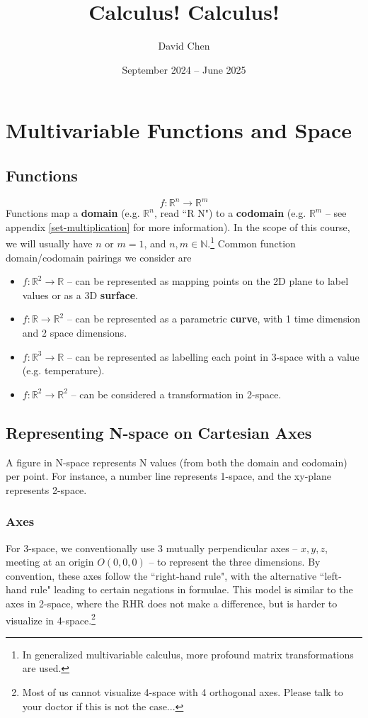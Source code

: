\documentclass{article}
\title{Calculus! Calculus!}
\author{David Chen}
\date{September 2024 -- June 2025}
\begin{document}
\maketitle

\section{Multivariable Functions and Space}

\subsection{Functions}
$$f: \mathbb{R}^n \to \mathbb{R}^m$$
Functions map a \textbf{domain} (e.g. $\mathbb{R}^n$, read ``R N") to a \textbf{codomain} (e.g. $\mathbb{R}^m$ -- see appendix \ref{set-multiplication} for more information). In the scope of this course, we will usually have $n$ or $m = 1$, and $n,m \in \mathbb{N}$.\footnote{In generalized multivariable calculus, more profound matrix transformations are used.}
Common function domain/codomain pairings we consider are
\begin{itemize}
    \item $f: \mathbb{R}^2 \to \mathbb{R}$ -- can be represented as mapping points on the 2D plane to label values or as a 3D \textbf{surface}.
    \item $f: \mathbb{R} \to \mathbb{R}^2$ -- can be represented as a parametric \textbf{curve}, with 1 time dimension and 2 space dimensions.
    \item $f: \mathbb{R}^3 \to \mathbb{R}$ -- can be represented as labelling each point in 3-space with a value (e.g. temperature).
    \item $f: \mathbb{R}^2 \to \mathbb{R}^2$ -- can be considered a transformation in 2-space.
\end{itemize}

\subsection{Representing N-space on Cartesian Axes}
A figure in N-space represents N values (from both the domain and codomain) per point. For instance, a number line represents 1-space, and the xy-plane represents 2-space.

\subsubsection{Axes}
For 3-space, we conventionally use 3 mutually perpendicular axes -- $x, y, z$, meeting at an origin $O(0,0,0)$ -- to represent the three dimensions. By convention, these axes follow the ``right-hand rule", with the alternative ``left-hand rule" leading to certain negations in formulae.
This model is similar to the axes in 2-space, where the RHR does not make a difference, but is harder to visualize in 4-space.\footnote{Most of us cannot visualize 4-space with 4 orthogonal axes. Please talk to your doctor if this is not the case...}
\end{document}
